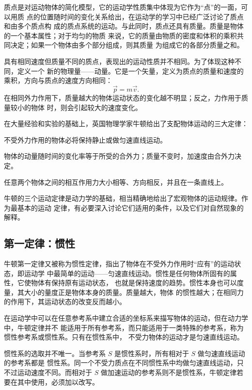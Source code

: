 质点是对运动物体的简化模型，它的运动学性质集中体现为它作为“点”的一面，可以用质
点的位置随时间的变化关系给出，在运动学的学习中已经广泛讨论了质点和由多个质点构
成的质点系统的运动。与此同时，质点还具有质量。质量是物体的一个基本属性；对于均匀的物质
来说，它的质量由物质的密度和体积的乘积共同决定；如果一个物体由多个部分组成，则其质量
为组成它的各部分质量之和。

具有相同速度但质量不同的质点，表现出的运动性质并不相同。为了体现这种不同，定义一个
新的物理量——动量。它是一个矢量，定义为质点的质量和速度的乘积，方向与质点的速度方向相同：
\begin{equation}
  \vec p=m\vec v.
\end{equation}
在相同外力作用下，质量越大的物体运动状态的变化越不明显；反之，力作用于质量较小的物体
时，则会引起较大的速度变化。

在大量经验和实验的基础上，英国物理学家牛顿给出了支配物体运动的三大定律：
\begin{description}[style=nextline,leftmargin=2em,labelindent=0pt]
  \item[第一定律]不受外力作用的物体必将保持静止或做匀速直线运动。
  \item[第二定律]物体的动量随时间的变化率等于所受的合外力；质量不变时，加速度由合外力决定。
  \item[第三定律]任意两个物体之间的相互作用力大小相等、方向相反，并且在一条直线上。
\end{description}
牛顿的三个运动定律是动力学的基础，相当精确地给出了宏观物体的运动规律。作为最基本的运动
定律，有必要深入讨论它们适用的条件，以及它们对自然现象的解释。

\subsection{第一定律：惯性}

牛顿第一定律又被称为惯性定律，指出了物体在不受外力作用时“应有”的运动状态，即运动学
中最简单的运动——匀速直线运动。惯性是任何物体所固有的属性，它使物体有保持原有运动状态，
也就是保持速度的趋势。惯性本身也可以度量，其大小的量度正是物体本身的质量。质量越大，物体
的惯性越大；在相同力的作用下，其运动状态的改变反而越小。

在运动学中可以在任意参考系中建立合适的坐标系来描写物体的运动，但在动力学中，牛顿定律并不
能适用于所有参考系，而只能适用于一类特殊的参考系，称为惯性参考系或惯性系。只有在惯性系中，
不受力物体的运动才是匀速直线运动。

惯性系的选取并不唯一。当参考系 $S$ 是惯性系时，所有相对于 $S$ 做匀速直线运动的参考系都是
惯性系。同一个不受力质点在不同惯性系中均做匀速直线运动，只不过运动速度不同。而相对于
$S$ 做加速运动的参考系则不是惯性系，牛顿定律若要在其中使用，必须加以改写。

